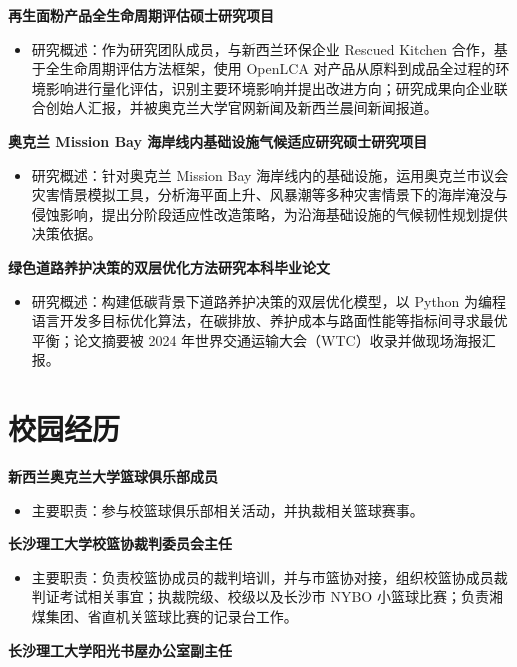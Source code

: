 \documentclass[11pt,a4paper,fontset=none]{ctexart}
\newcommand{\rinfo}[1]{\begin{itemize}[leftmargin=1.2em, labelindent=0pt, labelwidth=0.7em, labelsep=0.5em, itemindent=0pt, label=$\circ$, nosep, topsep=0.15em, itemsep=0em, parsep=0em, partopsep=0em]\item #1\end{itemize}}
\begin{document}
\vspace{0.05em}

\noindent
\textbf{再生面粉产品全生命周期评估}\hfill{}\textbf{硕士研究项目}

\rinfo{研究概述：作为研究团队成员，与新西兰环保企业 Rescued Kitchen 合作，基于全生命周期评估方法框架，使用 OpenLCA 对产品从原料到成品全过程的环境影响进行量化评估，识别主要环境影响并提出改进方向；研究成果向企业联合创始人汇报，并被奥克兰大学官网新闻及新西兰晨间新闻报道。}

\vspace{0.05em}

\noindent
\textbf{奥克兰 Mission Bay 海岸线内基础设施气候适应研究}\hfill{}\textbf{硕士研究项目}

\rinfo{研究概述：针对奥克兰 Mission Bay 海岸线内的基础设施，运用奥克兰市议会灾害情景模拟工具，分析海平面上升、风暴潮等多种灾害情景下的海岸淹没与侵蚀影响，提出分阶段适应性改造策略，为沿海基础设施的气候韧性规划提供决策依据。}

\vspace{0.05em}

\noindent
\textbf{绿色道路养护决策的双层优化方法研究}\hfill{}\textbf{本科毕业论文}

\rinfo{研究概述：构建低碳背景下道路养护决策的双层优化模型，以 Python 为编程语言开发多目标优化算法，在碳排放、养护成本与路面性能等指标间寻求最优平衡；论文摘要被 2024 年世界交通运输大会（WTC）收录并做现场海报汇报。}

\section*{校园经历}
\vspace{-0.1em}

\noindent
\textbf{新西兰奥克兰大学}\hfill\textbf{篮球俱乐部成员}

\rinfo{主要职责：参与校篮球俱乐部相关活动，并执裁相关篮球赛事。}


\vspace{0.05em}
\noindent
\textbf{长沙理工大学}\hfill\textbf{校篮协裁判委员会主任}

\rinfo{主要职责：负责校篮协成员的裁判培训，并与市篮协对接，组织校篮协成员裁判证考试相关事宜；执裁院级、校级以及长沙市 NYBO 小篮球比赛；负责湘煤集团、省直机关篮球比赛的记录台工作。}

\vspace{0.05em}
\noindent
\textbf{长沙理工大学}\hfill\textbf{阳光书屋办公室副主任}
\end{document}
